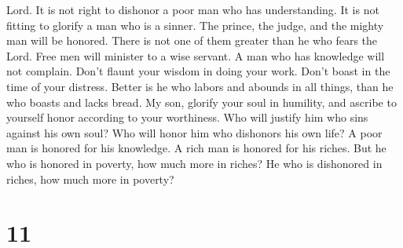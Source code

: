Lord.  It is not right to dishonor a poor man who has
understanding. It is not fitting to glorify a man who is a sinner.
 The prince, the judge, and the mighty man will be
honored. There is not one of them greater than he who fears the Lord.
 Free men will minister to a wise servant. A man who has
knowledge will not complain.  Don't flaunt your wisdom in
doing your work. Don't boast in the time of your distress.
 Better is he who labors and abounds in all things, than
he who boasts and lacks bread.  My son, glorify your soul
in humility, and ascribe to yourself honor according to your worthiness.
 Who will justify him who sins against his own soul? Who
will honor him who dishonors his own life?  A poor man is
honored for his knowledge. A rich man is honored for his riches.
 But he who is honored in poverty, how much more in
riches? He who is dishonored in riches, how much more in poverty?

\hypertarget{section-8}{%
\section{11}\label{section-8}}

